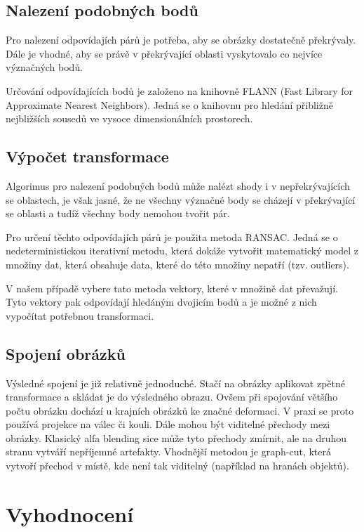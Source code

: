 \documentclass[12pt,a4paper,titlepage,final]{article}
\begin{document}
\subsection{Nalezení podobných bodů}

Pro nalezení odpovídajích párů je potřeba, aby se obrázky dostatečně překrývaly.
Dále je vhodné, aby se právě v překrývající oblasti vyskytovalo co nejvíce význačných
bodů.

Určování odpovídajících bodů je založeno na knihovně FLANN (Fast Library for
Approximate Nearest Neighbors). Jedná se o knihovnu pro hledání přibližně
nejbližších sousedů ve vysoce dimensionálních prostorech.

\subsection{Výpočet transformace}

Algorimus pro nalezení podobných bodů může nalézt shody i v nepřekrývajících se
oblastech, je však jasné, že ne všechny význačné body se cházejí v překrývající
se oblasti a tudíž všechny body nemohou tvořit pár.

Pro určení těchto odpovídajích párů je použita metoda RANSAC. Jedná se o
nedeterministickou iterativní metodu, která dokáže vytvořit matematický model
z množiny dat, která obsahuje data, které do této množiny nepatří (tzv. outliers).

V našem případě vybere tato metoda vektory, které v množině dat převažují.
Tyto vektory pak odpovídají hledáným dvojicím bodů a je možné z nich vypočítat
potřebnou transformaci.

\subsection{Spojení obrázků}

Výsledné spojení je již relativně jednoduché. Stačí na obrázky aplikovat zpětné
transformace a skládat je do výsledného obrazu.
Ovšem při spojování většího počtu obrázku dochází u krajních obrázků ke značné
deformaci. V praxi se proto používá projekce na válec či kouli.
Dále mohou být viditelné přechody mezi obrázky. Klasický alfa blending
sice může tyto přechody zmírnit, ale na druhou stranu vytváří nepříjemné
artefakty. Vhodnější metodou je graph-cut, která vytvoří přechod v místě, kde
není tak viditelný (například na hranách objektů).

\section{Vyhodnocení}
\end{document}
